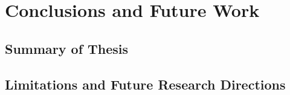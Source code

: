 
\chapter{Conclusions and Future Work}
\label{chap:conclusions}

  \section{Summary of Thesis}
  \section{Limitations and Future Research Directions}